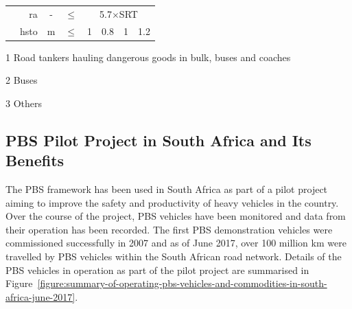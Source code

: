 \begin{table}[H]
\begin{threeparttable}
\begin{tabular}{crcccccc}
              & \gls{ra} & -     & $\leq$  & \multicolumn{4}{c}{5.7$\times$SRT} \bigstrut\\
              & \gls{hsto} & m     & $\leq$  & 1     & 0.8   & 1     & 1.2 \bigstrut\\
        \bottomrule
      \end{tabular}%
    \begin{tablenotes}
      \item[1] Road tankers hauling dangerous goods in bulk, buses and coaches
      \item[2] Buses
      \item[3] Others
    \end{tablenotes}
    \end{threeparttable}
  \end{table}%

\subsection{PBS Pilot Project in South Africa and Its Benefits}\label{section:pbs-pilot-project-in-south-africa}

    The PBS framework has been used in South Africa as part of a pilot project aiming to improve the safety and productivity of heavy vehicles in the country. Over the course of the project, PBS vehicles have been monitored and data from their operation has been recorded. The first PBS demonstration vehicles were commissioned successfully in 2007 and as of June 2017, over 100 million km were travelled by PBS vehicles within the South African road network. Details of the PBS vehicles in operation as part of the pilot project are summarised in Figure~\ref{figure:summary-of-operating-pbs-vehicles-and-commodities-in-south-africa-june-2017}.

